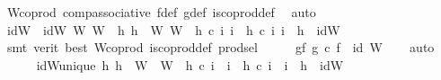 \begin{isabellebody}
\ W{\isacharprime}{\kern0pt}{\isacharunderscore}{\kern0pt}coprod\ comp{\isacharunderscore}{\kern0pt}associative{}\ f{\isacharunderscore}{\kern0pt}def\ g{\isacharunderscore}{\kern0pt}def\ is{\isacharunderscore}{\kern0pt}coprod{\isacharunderscore}{\kern0pt}def\ \isamarkupfalse%
\ auto\isanewline
\isanewline
\ \ \isamarkupfalse%
\ idW{\isacharprime}{\kern0pt}\ \ {\isachardoublequoteopen}idW{\isacharprime}{\kern0pt}{\isacharcolon}{\kern0pt}\ W{\isacharprime}{\kern0pt}{\isasymrightarrow}\ W{\isacharprime}{\kern0pt}{\isasymand}\ {\isacharparenleft}{\kern0pt}{\isasymforall}\ h{}{\isachardot}{\kern0pt}\ {\isacharparenleft}{\kern0pt}h{}\ {\isacharcolon}{\kern0pt}\ W{\isacharprime}{\kern0pt}{\isasymrightarrow}\ W{\isacharprime}{\kern0pt}{\isasymand}\ \ h{}\ {\isasymcirc}\isactrlsub c\ i{\isacharprime}{\kern0pt}\ i{\isacharprime}{\kern0pt}\ {\isasymand}\ h{}\ {\isasymcirc}\isactrlsub c\ i{\isacharprime}{\kern0pt}\ i{\isacharprime}{\kern0pt}\ {\isasymlongrightarrow}\ h{}\ {\isacharequal}{\kern0pt}\ idW{\isacharprime}{\kern0pt}{\isacharparenright}{\kern0pt}{\isachardoublequoteclose}\isanewline
\ \ \ \ \isamarkupfalse%
\ {\isacharparenleft}{\kern0pt}smt\ {\isacharparenleft}{\kern0pt}verit{\isacharcomma}{\kern0pt}\ best{\isacharparenright}{\kern0pt}\ W{\isacharprime}{\kern0pt}{\isacharunderscore}{\kern0pt}coprod\ is{\isacharunderscore}{\kern0pt}coprod{\isacharunderscore}{\kern0pt}def\ prod{\isachardot}{\kern0pt}sel{\isacharparenright}{\kern0pt}\isanewline
\ \ \isamarkupfalse%
\ \isamarkupfalse%
\ gf{\isacharcolon}{\kern0pt}\ {\isachardoublequoteopen}g\ {\isasymcirc}\isactrlsub c\ f\ {\isacharequal}{\kern0pt}\ id\ W{\isacharprime}{\kern0pt}{\isachardoublequoteclose}\isanewline
\ \ \isamarkupfalse%
\ auto\isanewline
\ \ \ \ \isamarkupfalse%
\ idW{\isacharprime}{\kern0pt}{\isacharunderscore}{\kern0pt}unique{\isacharcolon}{\kern0pt}\ {\isachardoublequoteopen}{\isasymforall}h{}{\isachardot}{\kern0pt}\ h{}\ {\isacharcolon}{\kern0pt}\ W{\isacharprime}{\kern0pt}\ {\isasymrightarrow}\ W{\isacharprime}{\kern0pt}\ {\isasymand}\ h{}\ {\isasymcirc}\isactrlsub c\ i{\isacharprime}{\kern0pt}\ {\isacharequal}{\kern0pt}\ i{\isacharprime}{\kern0pt}\ {\isasymand}\ h{}\ {\isasymcirc}\isactrlsub c\ i{\isacharprime}{\kern0pt}\ {\isacharequal}{\kern0pt}\ i{\isacharprime}{\kern0pt}\ {\isasymlongrightarrow}\ h{}\ {\isacharequal}{\kern0pt}\ idW{\isacharprime}{\kern0pt}{\isachardoublequoteclose}\isanewline

\end{isabellebody}
